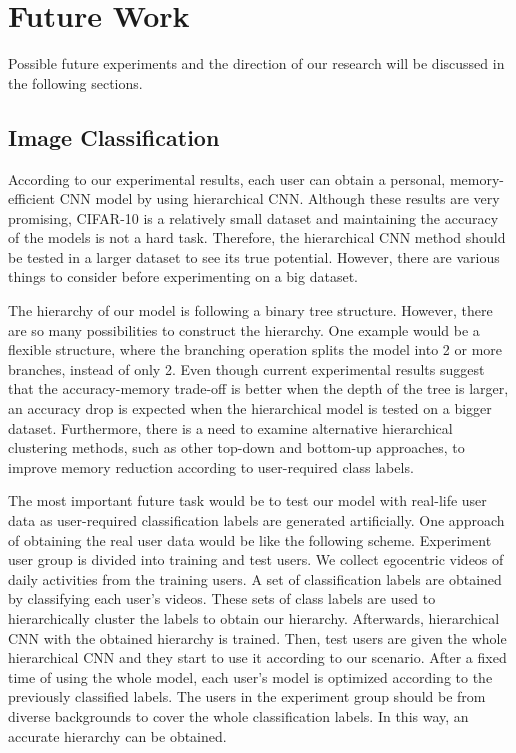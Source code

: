 \section{Future Work}

Possible future experiments and the direction of our research will be discussed in the following sections.

\subsection*{Image Classification}

According to our experimental results, each user can obtain a personal, memory-efficient CNN model by using hierarchical CNN.
Although these results are very promising, CIFAR-10 is a relatively small dataset and maintaining the accuracy of the models is not a hard task.
Therefore, the hierarchical CNN method should be tested in a larger dataset to see its true potential. 
However, there are various things to consider before experimenting on a big dataset.

The hierarchy of our model is following a binary tree structure. 
However, there are so many possibilities to construct the hierarchy. 
One example would be a flexible structure, where the branching operation splits the model into 2 or more branches, instead of only 2. 
Even though current experimental results suggest that the accuracy-memory trade-off is better when the depth of the tree is larger, an accuracy drop is expected when the hierarchical model is tested on a bigger dataset.
Furthermore, there is a need to examine alternative hierarchical clustering methods, such as other top-down and bottom-up approaches, to improve memory reduction according to user-required class labels.

The most important future task would be to test our model with real-life user data as user-required classification labels are generated artificially.
One approach of obtaining the real user data would be like the following scheme.
Experiment user group is divided into training and test users. 
We collect egocentric videos of daily activities from the training users.
A set of classification labels are obtained by classifying each user's videos.
These sets of class labels are used to hierarchically cluster the labels to obtain our hierarchy. 
Afterwards, hierarchical CNN with the obtained hierarchy is trained. 
Then, test users are given the whole hierarchical CNN and they start to use it according to our scenario. 
After a fixed time of using the whole model, each user's model is optimized according to the previously classified labels.
The users in the experiment group should be from diverse backgrounds to cover the whole classification labels. 
In this way, an accurate hierarchy can be obtained.


